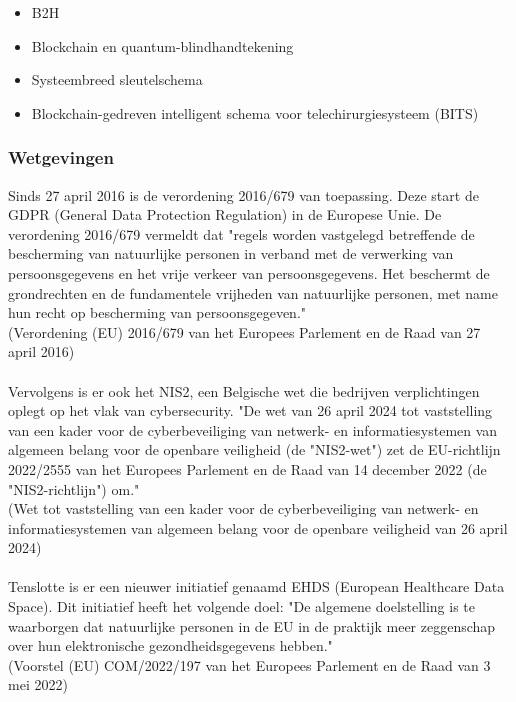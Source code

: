 \begin{itemize}
  \item B2H \autocite{Ghosh2022}
  \item Blockchain en quantum-blindhandtekening \autocite{Bhavin2021}
  \item Systeembreed sleutelschema \autocite{Chang2022}
  \item Blockchain-gedreven intelligent schema voor telechirurgiesysteem (BITS) \autocite{Gupta2020}
\end{itemize}

\subsubsection{Wetgevingen}

Sinds 27 april 2016 is de verordening 2016/679 van toepassing. Deze start de GDPR (General Data Protection Regulation) in de Europese Unie. De verordening 2016/679 vermeldt dat "regels worden vastgelegd betreffende de bescherming van natuurlijke personen in verband met de verwerking van persoonsgegevens en het vrije verkeer van persoonsgegevens. Het beschermt de grondrechten en de fundamentele vrijheden van natuurlijke personen, met name hun recht op bescherming van persoonsgegeven."\\ (Verordening (EU) 2016/679 van het Europees Parlement en de Raad van 27 april 2016) %
\\\\
Vervolgens is er ook het NIS2, een Belgische wet die bedrijven verplichtingen oplegt op het vlak van cybersecurity. "De wet van 26 april 2024 tot vaststelling van een kader voor de cyberbeveiliging van netwerk- en informatiesystemen van algemeen belang voor de openbare veiligheid (de "NIS2-wet") zet de EU-richtlijn 2022/2555 van het Europees Parlement en de Raad van 14 december 2022 (de "NIS2-richtlijn") om." \\
(Wet tot vaststelling van een kader voor de cyberbeveiliging van netwerk- en informatiesystemen van algemeen belang voor de openbare veiligheid van 26 april 2024) %
\\\\
Tenslotte is er een nieuwer initiatief genaamd EHDS (European Healthcare Data Space). Dit initiatief heeft het volgende doel: "De algemene doelstelling is te waarborgen dat natuurlijke personen in de EU in de praktijk meer zeggenschap over hun elektronische gezondheidsgegevens hebben."\\ (Voorstel (EU) COM/2022/197 van het Europees Parlement en de Raad van 3 mei 2022) %

